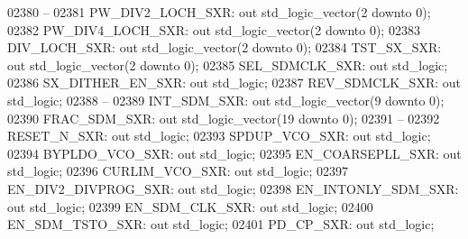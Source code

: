 \begin{DoxyCode}
02380 \textcolor{keyword}{    --}
02381     PW\_DIV2\_LOCH\_SXR:   \textcolor{keywordflow}{out} \textcolor{comment}{std\_logic\_vector}(\textcolor{vhdllogic}{}\textcolor{vhdllogic}{2} \textcolor{keywordflow}{downto} \textcolor{vhdllogic}{}\textcolor{vhdllogic}{0});
02382     PW\_DIV4\_LOCH\_SXR:   \textcolor{keywordflow}{out} \textcolor{comment}{std\_logic\_vector}(\textcolor{vhdllogic}{}\textcolor{vhdllogic}{2} \textcolor{keywordflow}{downto} \textcolor{vhdllogic}{}\textcolor{vhdllogic}{0});
02383     DIV\_LOCH\_SXR:   \textcolor{keywordflow}{out} \textcolor{comment}{std\_logic\_vector}(\textcolor{vhdllogic}{}\textcolor{vhdllogic}{2} \textcolor{keywordflow}{downto} \textcolor{vhdllogic}{}\textcolor{vhdllogic}{0});
02384     TST\_SX\_SXR: \textcolor{keywordflow}{out} \textcolor{comment}{std\_logic\_vector}(\textcolor{vhdllogic}{}\textcolor{vhdllogic}{2} \textcolor{keywordflow}{downto} \textcolor{vhdllogic}{}\textcolor{vhdllogic}{0});
02385     SEL\_SDMCLK\_SXR: \textcolor{keywordflow}{out} \textcolor{comment}{std\_logic};
02386     SX\_DITHER\_EN\_SXR:   \textcolor{keywordflow}{out} \textcolor{comment}{std\_logic};
02387     REV\_SDMCLK\_SXR: \textcolor{keywordflow}{out} \textcolor{comment}{std\_logic};
02388 \textcolor{keyword}{    --}
02389     INT\_SDM\_SXR:    \textcolor{keywordflow}{out} \textcolor{comment}{std\_logic\_vector}(\textcolor{vhdllogic}{}\textcolor{vhdllogic}{9} \textcolor{keywordflow}{downto} \textcolor{vhdllogic}{}\textcolor{vhdllogic}{0});
02390     FRAC\_SDM\_SXR:   \textcolor{keywordflow}{out} \textcolor{comment}{std\_logic\_vector}(\textcolor{vhdllogic}{}\textcolor{vhdllogic}{19} \textcolor{keywordflow}{downto} \textcolor{vhdllogic}{}\textcolor{vhdllogic}{0});
02391 \textcolor{keyword}{    --}
02392     RESET\_N\_SXR:    \textcolor{keywordflow}{out} \textcolor{comment}{std\_logic};
02393     SPDUP\_VCO\_SXR:  \textcolor{keywordflow}{out} \textcolor{comment}{std\_logic};
02394     BYPLDO\_VCO\_SXR: \textcolor{keywordflow}{out} \textcolor{comment}{std\_logic};
02395     EN\_COARSEPLL\_SXR:   \textcolor{keywordflow}{out} \textcolor{comment}{std\_logic};
02396     CURLIM\_VCO\_SXR: \textcolor{keywordflow}{out} \textcolor{comment}{std\_logic};
02397     EN\_DIV2\_DIVPROG\_SXR:    \textcolor{keywordflow}{out} \textcolor{comment}{std\_logic};
02398     EN\_INTONLY\_SDM\_SXR: \textcolor{keywordflow}{out} \textcolor{comment}{std\_logic};
02399     EN\_SDM\_CLK\_SXR: \textcolor{keywordflow}{out} \textcolor{comment}{std\_logic};
02400     EN\_SDM\_TSTO\_SXR:    \textcolor{keywordflow}{out} \textcolor{comment}{std\_logic};
02401     PD\_CP\_SXR:  \textcolor{keywordflow}{out} \textcolor{comment}{std\_logic};

\end{DoxyCode}
